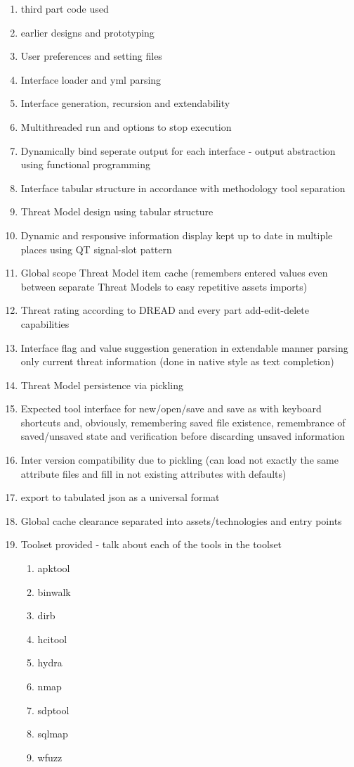 \begin{enumerate}
\begin{enumerate}
		\item third part code used
		
		\item earlier designs and prototyping
		
		\item User preferences and setting files
		\item Interface loader and yml parsing
		\item Interface generation, recursion and extendability
		\item Multithreaded run and options to stop execution
		\item Dynamically bind seperate output for each interface - output abstraction using functional programming
		\item Interface tabular structure in accordance with methodology tool separation
		
		\item Threat Model design using tabular structure 
		\item Dynamic and responsive information display kept up to date in multiple places using QT signal-slot pattern
		\item Global scope Threat Model item cache (remembers entered values even between separate Threat Models to easy repetitive assets imports)
		\item Threat rating according to DREAD and every part add-edit-delete capabilities
		\item Interface flag and value suggestion generation in extendable manner parsing only current threat information (done in native style as text completion)
		
		\item Threat Model persistence via pickling
		\item Expected tool interface for new/open/save and save as with keyboard shortcuts and, obviously, remembering saved file existence, remembrance of saved/unsaved state and verification before discarding unsaved information
		\item Inter version compatibility due to pickling (can load not exactly the same attribute files and fill in not existing attributes with defaults)
		\item export to tabulated json as a universal format
		\item Global cache clearance separated into assets/technologies and entry points
		
		\item Toolset provided - talk about each of the tools in the toolset
		\begin{enumerate}
			\item apktool
			\item binwalk
			\item dirb
			\item hcitool
			\item hydra
			\item nmap
			\item sdptool
			\item sqlmap
			\item wfuzz
		\end{enumerate}
		

\end{enumerate}
\end{enumerate}
